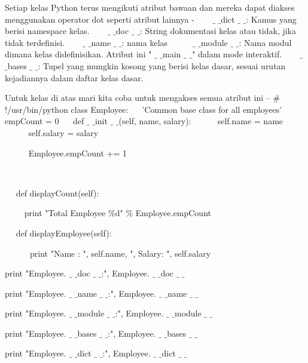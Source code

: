 {Setiap kelas Python terus mengikuti atribut bawaan dan mereka dapat diakses menggunakan operator dot seperti atribut lainnya - 
\vspace{12pt}
\noindent 
~~~  $  \_  $ $  \_  $dict $  \_  $ $  \_  $: Kamus yang berisi namespace kelas. 
\vspace{12pt}
\noindent 
~~~  $  \_  $ $  \_  $doc $  \_  $ $  \_  $: String dokumentasi kelas atau tidak, jika tidak terdefinisi. 
\vspace{12pt}
\noindent 
~~~  $  \_  $ $  \_  $name $  \_  $ $  \_  $: nama kelas \
\vspace{12pt}
\noindent 
~~~  $  \_  $ $  \_  $module $  \_  $ $  \_  $: Nama modul dimana kelas didefinisikan. Atribut ini " $  \_  $ $  \_  $main $  \_  $ $  \_  $" dalam mode interaktif. 
\vspace{12pt}
\noindent 
~~~  $  \_  $ $  \_  $bases $  \_  $ $  \_  $: Tupel yang mungkin kosong yang berisi kelas dasar, sesuai urutan kejadiannya dalam daftar kelas dasar. 
\vspace{12pt}
\noindent 

Untuk kelas di atas mari kita coba untuk mengakses semua atribut ini – 
\vspace{12pt}
\noindent 
 $  \#  $!/usr/bin/python 
\vspace{12pt}
\noindent 
class Employee: 
\noindent 
~~ 'Common base class for all employees' 
\noindent 
~~ empCount = 0 
\vspace{12pt}
\noindent 
~~ def  $  \_  $ $  \_  $init $  \_  $ $  \_  $(self, name, salary): 
\noindent 
~~~~~ self.name = name 
\noindent 
~~~~~ self.salary = salary \par
\noindent 
~~~~~ Employee.empCount += 1 \par
\noindent 
~~  \par
\noindent 
~~ def displayCount(self): \par
\noindent 
~~~~ print "Total Employee  $  \%  $d"  $  \%  $ Employee.empCount \par
\vspace{12pt}
\noindent 
~~ def displayEmployee(self): \par
\noindent 
~~~~~~print "Name : ", self.name,  ", Salary: ", self.salary \par
\vspace{12pt}
\noindent 
print "Employee. $  \_  $ $  \_  $doc $  \_  $ $  \_  $:", Employee. $  \_  $ $  \_  $doc $  \_  $ $  \_  $ \par
\noindent 
print "Employee. $  \_  $ $  \_  $name $  \_  $ $  \_  $:", Employee. $  \_  $ $  \_  $name $  \_  $ $  \_  $ \par
\noindent 
print "Employee. $  \_  $ $  \_  $module $  \_  $ $  \_  $:", Employee. $  \_  $ $  \_  $module $  \_  $ $  \_  $ \par
\noindent 
print "Employee. $  \_  $ $  \_  $bases $  \_  $ $  \_  $:", Employee. $  \_  $ $  \_  $bases $  \_  $ $  \_  $ \par
\noindent 
print "Employee. $  \_  $ $  \_  $dict $  \_  $ $  \_  $:", Employee. $  \_  $ $  \_  $dict $  \_  $ $  \_  $ \par
\vspace{12pt}
\vspace{12pt}
\noindent 

}
